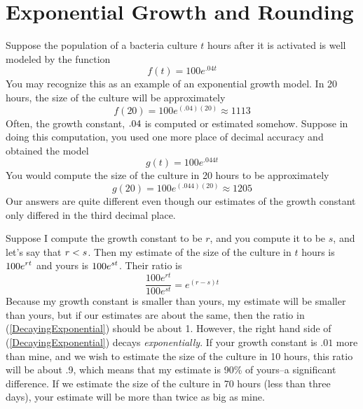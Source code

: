 



\section*{Exponential Growth and Rounding}

Suppose the population of a bacteria culture $t$ hours after it is activated is well modeled by the function 
\[
  f(t) = 100 e^{.04 t}
\]
You may recognize this as an example of an exponential growth model. In 20 hours, the size of the culture will be approximately
\[
  f(20) = 100 e^{(.04)(20)} \approx 1113
\]
Often, the growth constant, $\displaystyle .04$ is computed or estimated somehow. Suppose in doing this computation, you used one more place of decimal accuracy and obtained the model 
\[
  g(t) = 100 e^{.044 t}
\]
You would compute the size of the culture in 20 hours to be approximately
\[
  g(20) = 100 e^{(.044)(20)} \approx 1205
\]
Our answers are quite different even though our estimates of the growth constant only differed in the third decimal place.

Suppose I compute the growth constant to be $r$, and you compute it to be $s$, and let's say that $\displaystyle r<s$. Then my estimate of the size of the culture in $t$ hours is $\displaystyle 100 e^{rt}$ and yours is $\displaystyle 100 e^{s t}$. Their ratio is
\begin{equation} \label{DecayingExponential}
  \frac{100 e^{r t}}{100 e^{st}} = e^{(r-s) t}
\end{equation}
Because my growth constant is smaller than yours, my estimate will be smaller than yours, but if our estimates are about the same, then the ratio in (\ref{DecayingExponential}) should be about 1. However, the right hand side of (\ref{DecayingExponential}) decays \textit{exponentially}. If your growth constant is $.01$ more than mine, and we wish to estimate the size of the culture in 10 hours, this ratio will be about .9, which means that my estimate is 90\% of yours--a significant difference. If we estimate the size of the culture in 70 hours (less than three days), your estimate will be more than twice as big as mine.




